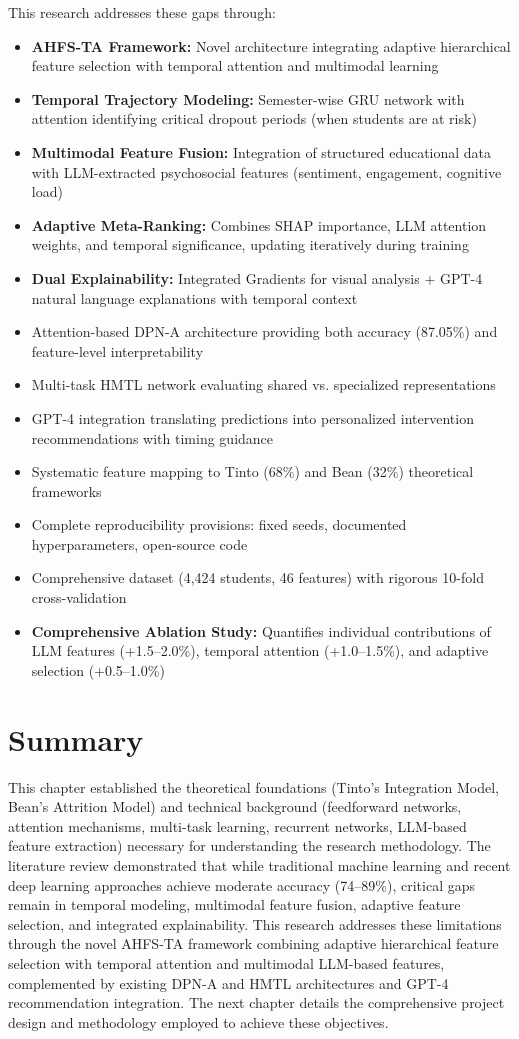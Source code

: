 This research addresses these gaps through:
\begin{itemize}
\item \textbf{AHFS-TA Framework:} Novel architecture integrating adaptive hierarchical feature selection with temporal attention and multimodal learning
\item \textbf{Temporal Trajectory Modeling:} Semester-wise GRU network with attention identifying critical dropout periods (when students are at risk)
\item \textbf{Multimodal Feature Fusion:} Integration of structured educational data with LLM-extracted psychosocial features (sentiment, engagement, cognitive load)
\item \textbf{Adaptive Meta-Ranking:} Combines SHAP importance, LLM attention weights, and temporal significance, updating iteratively during training
\item \textbf{Dual Explainability:} Integrated Gradients for visual analysis + GPT-4 natural language explanations with temporal context
\item Attention-based DPN-A architecture providing both accuracy (87.05\%) and feature-level interpretability
\item Multi-task HMTL network evaluating shared vs. specialized representations
\item GPT-4 integration translating predictions into personalized intervention recommendations with timing guidance
\item Systematic feature mapping to Tinto (68\%) and Bean (32\%) theoretical frameworks
\item Complete reproducibility provisions: fixed seeds, documented hyperparameters, open-source code
\item Comprehensive dataset (4,424 students, 46 features) with rigorous 10-fold cross-validation
\item \textbf{Comprehensive Ablation Study:} Quantifies individual contributions of LLM features (+1.5--2.0\%), temporal attention (+1.0--1.5\%), and adaptive selection (+0.5--1.0\%)
\end{itemize}

\section{Summary}

This chapter established the theoretical foundations (Tinto's Integration Model, Bean's Attrition Model) and technical background (feedforward networks, attention mechanisms, multi-task learning, recurrent networks, LLM-based feature extraction) necessary for understanding the research methodology. The literature review demonstrated that while traditional machine learning and recent deep learning approaches achieve moderate accuracy (74--89\%), critical gaps remain in temporal modeling, multimodal feature fusion, adaptive feature selection, and integrated explainability. This research addresses these limitations through the novel AHFS-TA framework combining adaptive hierarchical feature selection with temporal attention and multimodal LLM-based features, complemented by existing DPN-A and HMTL architectures and GPT-4 recommendation integration. The next chapter details the comprehensive project design and methodology employed to achieve these objectives.
